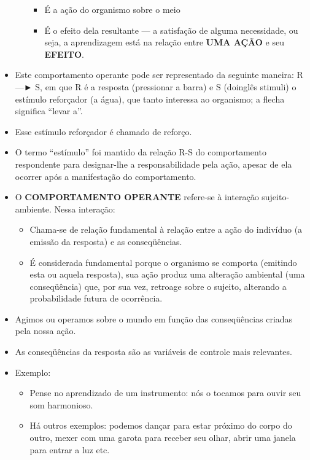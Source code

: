 \documentclass[
]{book}
\providecommand{\tightlist}{%
  \setlength{\itemsep}{0pt}\setlength{\parskip}{0pt}}
\begin{document}
\begin{itemize}
\begin{itemize}
    \begin{itemize}
    \tightlist
    \item
      É a ação do organismo sobre o meio
    \item
      É o efeito dela resultante --- a satisfação de alguma necessidade,
      ou seja, a aprendizagem está na relação entre \textbf{UMA AÇÃO} e
      seu \textbf{EFEITO}.
    \end{itemize}
  \end{itemize}
\item
  Este comportamento operante pode ser representado da seguinte maneira:
  R ---► S, em que R é a resposta (pressionar a barra) e S (doinglês
  stimuli) o estímulo reforçador (a água), que tanto interessa ao
  organismo; a flecha significa ``levar a''.
\item
  Esse estímulo reforçador é chamado de reforço.
\item
  O termo ``estímulo'' foi mantido da relação R-S do comportamento
  respondente para designar-lhe a responsabilidade pela ação, apesar de
  ela ocorrer após a manifestação do comportamento.
\item
  O \textbf{COMPORTAMENTO OPERANTE} refere-se à interação
  sujeito-ambiente. Nessa interação:

  \begin{itemize}
  \tightlist
  \item
    Chama-se de relação fundamental à relação entre a ação do indivíduo
    (a emissão da resposta) e as conseqüências.
  \item
    É considerada fundamental porque o organismo se comporta (emitindo
    esta ou aquela resposta), sua ação produz uma alteração ambiental
    (uma conseqüência) que, por sua vez, retroage sobre o sujeito,
    alterando a probabilidade futura de ocorrência.
  \end{itemize}
\item
  Agimos ou operamos sobre o mundo em função das conseqüências criadas
  pela nossa ação.
\item
  As conseqüências da resposta são as variáveis de controle mais
  relevantes.
\item
  Exemplo:

  \begin{itemize}
  \tightlist
  \item
    Pense no aprendizado de um instrumento: nós o tocamos para ouvir seu
    som harmonioso.
  \item
    Há outros exemplos: podemos dançar para estar próximo do corpo do
    outro, mexer com uma garota para receber seu olhar, abrir uma janela
    para entrar a luz etc.
  \end{itemize}
\end{itemize}
\end{document}

